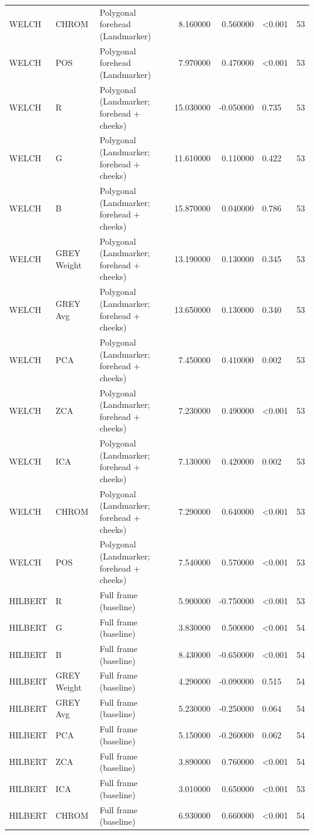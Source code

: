 \begin{table}[htbp]
\begin{tabular}{l l l r r l r}
WELCH & CHROM & Polygonal forehead (Landmarker) & 8.160000 & 0.560000 & <0.001 & 53 \\
WELCH & POS & Polygonal forehead (Landmarker) & 7.970000 & 0.470000 & <0.001 & 53 \\
WELCH & R & Polygonal (Landmarker; forehead + cheeks) & 15.030000 & -0.050000 & 0.735 & 53 \\
WELCH & G & Polygonal (Landmarker; forehead + cheeks) & 11.610000 & 0.110000 & 0.422 & 53 \\
WELCH & B & Polygonal (Landmarker; forehead + cheeks) & 15.870000 & 0.040000 & 0.786 & 53 \\
WELCH & GREY Weight & Polygonal (Landmarker; forehead + cheeks) & 13.190000 & 0.130000 & 0.345 & 53 \\
WELCH & GREY Avg & Polygonal (Landmarker; forehead + cheeks) & 13.650000 & 0.130000 & 0.340 & 53 \\
WELCH & PCA & Polygonal (Landmarker; forehead + cheeks) & 7.450000 & 0.410000 & 0.002 & 53 \\
WELCH & ZCA & Polygonal (Landmarker; forehead + cheeks) & 7.230000 & 0.490000 & <0.001 & 53 \\
WELCH & ICA & Polygonal (Landmarker; forehead + cheeks) & 7.130000 & 0.420000 & 0.002 & 53 \\
WELCH & CHROM & Polygonal (Landmarker; forehead + cheeks) & 7.290000 & 0.640000 & <0.001 & 53 \\
WELCH & POS & Polygonal (Landmarker; forehead + cheeks) & 7.540000 & 0.570000 & <0.001 & 53 \\
HILBERT & R & Full frame (baseline) & 5.900000 & -0.750000 & <0.001 & 53 \\
HILBERT & G & Full frame (baseline) & 3.830000 & 0.500000 & <0.001 & 54 \\
HILBERT & B & Full frame (baseline) & 8.430000 & -0.650000 & <0.001 & 54 \\
HILBERT & GREY Weight & Full frame (baseline) & 4.290000 & -0.090000 & 0.515 & 54 \\
HILBERT & GREY Avg & Full frame (baseline) & 5.230000 & -0.250000 & 0.064 & 54 \\
HILBERT & PCA & Full frame (baseline) & 5.150000 & -0.260000 & 0.062 & 54 \\
HILBERT & ZCA & Full frame (baseline) & 3.890000 & 0.760000 & <0.001 & 54 \\
HILBERT & ICA & Full frame (baseline) & 3.010000 & 0.650000 & <0.001 & 53 \\
HILBERT & CHROM & Full frame (baseline) & 6.930000 & 0.660000 & <0.001 & 54 \\

\end{tabular}
\end{table}
